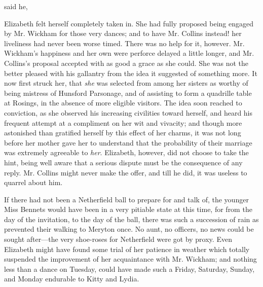  said he, 

Elizabeth felt herself completely taken in. She had fully proposed being engaged by Mr. Wickham for those very dances; and to have Mr. Collins instead! her liveliness had never been worse timed. There was no help for it, however. Mr. Wickham's happiness and her own were perforce delayed a little longer, and Mr. Collins's proposal accepted with as good a grace as she could. She was not the better pleased with his gallantry from the idea it suggested of something more. It now first struck her, that {\em she} was selected from among her sisters as worthy of being mistress of Hunsford Parsonage, and of assisting to form a quadrille table at Rosings, in the absence of more eligible visitors. The idea soon reached to conviction, as she observed his increasing civilities toward herself, and heard his frequent attempt at a compliment on her wit and vivacity; and though more astonished than gratified herself by this effect of her charms, it was not long before her mother gave her to understand that the probability of their marriage was extremely agreeable to {\em her}. Elizabeth, however, did not choose to take the hint, being well aware that a serious dispute must be the consequence of any reply. Mr. Collins might never make the offer, and till he did, it was useless to quarrel about him.

If there had not been a Netherfield ball to prepare for and talk of, the younger Miss Bennets would have been in a very pitiable state at this time, for from the day of the invitation, to the day of the ball, there was such a succession of rain as prevented their walking to Meryton once. No aunt, no officers, no news could be sought after---the very shoe-roses for Netherfield were got by proxy. Even Elizabeth might have found some trial of her patience in weather which totally suspended the improvement of her acquaintance with Mr. Wickham; and nothing less than a dance on Tuesday, could have made such a Friday, Saturday, Sunday, and Monday endurable to Kitty and Lydia.

